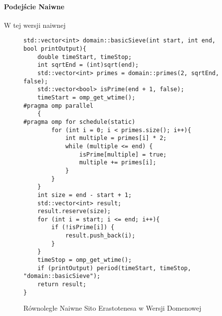 \documentclass{article}
\begin{document}
                \paragraph{Podejście Naiwne}
                    W tej wersji naiwnej 
                    \begin{figure}
                        \begin{verbatim}
std::vector<int> domain::basicSieve(int start, int end, bool printOutput){
    double timeStart, timeStop;
    int sqrtEnd = (int)sqrt(end);
    std::vector<int> primes = domain::primes(2, sqrtEnd, false);
    std::vector<bool> isPrime(end + 1, false);
    timeStart = omp_get_wtime();
#pragma omp parallel 
    {
#pragma omp for schedule(static)
        for (int i = 0; i < primes.size(); i++){
            int multiple = primes[i] * 2;
            while (multiple <= end) {
                isPrime[multiple] = true;
                multiple += primes[i];
            }
        }
    }
    int size = end - start + 1;
    std::vector<int> result;
    result.reserve(size);
    for (int i = start; i <= end; i++){
        if (!isPrime[i]) {
            result.push_back(i);
        }
    }
    timeStop = omp_get_wtime();
    if (printOutput) period(timeStart, timeStop, "domain::basicSieve");
    return result;
}
                        \end{verbatim}
                        \caption{Równoległe Naiwne Sito Erastotenesa w Wersji Domenowej}
                    \end{figure}
                    
\end{document}
